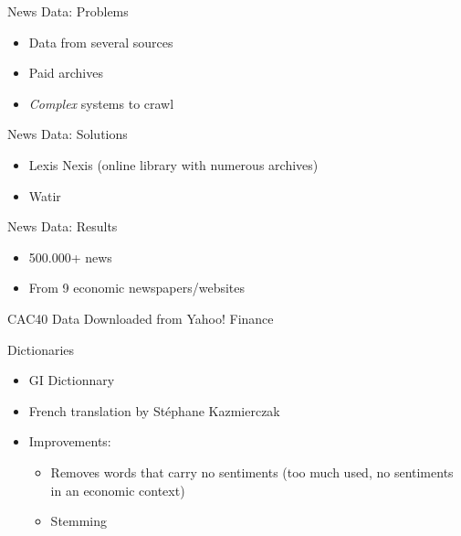 \documentclass{beamer}
\begin{document}
\begin{frame}{News Data: Problems}
	\begin{itemize}
		\item Data from several sources
		\item Paid archives
		\item \emph{Complex} systems to crawl
	\end{itemize}
\end{frame}

\begin{frame}{News Data: Solutions}
	\begin{itemize}
		\item Lexis Nexis (online library with numerous archives)
		\item Watir
	\end{itemize}
\end{frame}

\begin{frame}{News Data: Results}
	\begin{itemize}
		\item 500.000+ news
		\item From 9 economic newspapers/websites
	\end{itemize}
\end{frame}

\begin{frame}{CAC40 Data}
	Downloaded from Yahoo! Finance
\end{frame}

\begin{frame}{Dictionaries}
	\begin{itemize}
		\item GI Dictionnary
		\item French translation by Stéphane Kazmierczak
		\pause \item Improvements:
			\begin{itemize}
				\item Removes words that carry no sentiments (too much used, no sentiments in an economic context)
				\item Stemming
			\end{itemize}
	\end{itemize}
\end{frame}
\end{document}
